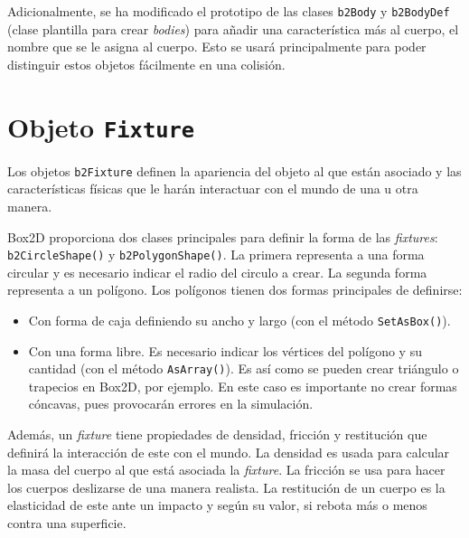 

Adicionalmente, se ha modificado el prototipo de las clases \texttt{b2Body} y \texttt{b2BodyDef} (clase plantilla para crear \emph{bodies}) para añadir una característica más al cuerpo, el nombre que se le asigna al cuerpo. Esto se usará principalmente para poder distinguir estos objetos fácilmente en una colisión.


\section*{Objeto \texttt{Fixture}}

Los objetos \texttt{b2Fixture} definen la apariencia del objeto al que están asociado y las características físicas que le harán interactuar con el mundo de una u otra manera.

Box2D proporciona dos clases principales para definir la forma de las \emph{fixtures}: \texttt{b2CircleShape()} y \texttt{b2PolygonShape()}. La primera representa a una forma circular y es necesario indicar el radio del circulo a crear. La segunda forma representa a un polígono. Los polígonos tienen dos formas principales de definirse:

\begin{itemize}
	\item Con forma de caja definiendo su ancho y largo (con el método \texttt{SetAsBox()}).
	\item Con una forma libre. Es necesario indicar los vértices del polígono y su cantidad (con el método \texttt{AsArray()}). Es así como se pueden crear triángulo o trapecios en Box2D, por ejemplo. En este caso es importante no crear formas cóncavas, pues provocarán errores en la simulación.
\end{itemize}


Además, un \emph{fixture} tiene propiedades de densidad, fricción y restitución que definirá la interacción de este con el mundo. La densidad es usada para calcular la masa del cuerpo al que está asociada la \emph{fixture}. La fricción se usa para hacer los cuerpos deslizarse de una manera realista. La restitución de un cuerpo es la elasticidad de este ante un impacto y según su valor, si rebota más o menos contra una superficie. 

